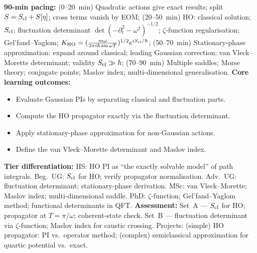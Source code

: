 \documentclass[11pt,a4paper]{article}
\begin{document}
\begin{tcolorbox}[modulebox, title={Module~II.2 / L03: Gaussian Path Integrals}]
\textbf{90-min pacing:} (0--20~min) Quadratic actions give exact results; split $S=S_{\rm cl}+S[\eta]$; cross terms vanish by EOM; (20--50~min) HO: classical solution; $S_{\rm cl}$; fluctuation determinant $\det(-\partial_t^2-\omega^2)^{-1/2}$; $\zeta$-function regularisation; Gel'fand--Yaglom; $K_{\rm HO}=(\tfrac{m\omega}{2\pi i\hbar\sin\omega T})^{1/2}e^{iS_{\rm cl}/\hbar}$; (50--70~min) Stationary-phase approximation: expand around classical; leading Gaussian correction; van Vleck--Morette determinant; validity $S_{\rm cl}\gg\hbar$; (70--90~min) Multiple saddles; Morse theory; conjugate points; Maslov index; multi-dimensional generalisation.
\medskip\textbf{Core learning outcomes:}
\begin{itemize}[leftmargin=1.4em,topsep=2pt,itemsep=1pt]
  \item Evaluate Gaussian PIs by separating classical and fluctuation parts.
  \item Compute the HO propagator exactly via the fluctuation determinant.
  \item Apply stationary-phase approximation for non-Gaussian actions.
  \item Define the van Vleck--Morette determinant and Maslov index.
\end{itemize}
\medskip\textbf{Tier differentiation:}
HS: HO PI as ``the exactly solvable model'' of path integrals.
Beg.\ UG: $S_{\rm cl}$ for HO; verify propagator normalisation.
Adv.\ UG: fluctuation determinant; stationary-phase derivation.
MSc: van Vleck--Morette; Maslov index; multi-dimensional saddle.
PhD: $\zeta$-function; Gel'fand--Yaglom method; functional determinants in QFT.
\medskip\textbf{Assessment:}
Set~A --- $S_{\rm cl}$ for HO; propagator at $T=\pi/\omega$; coherent-state check.
Set~B --- fluctuation determinant via $\zeta$-function; Maslov index for caustic crossing.
Projects: (simple) HO propagator: PI vs.\ operator method; (complex) semiclassical approximation for quartic potential vs.\ exact.
\end{tcolorbox}

\medskip
\end{document}
